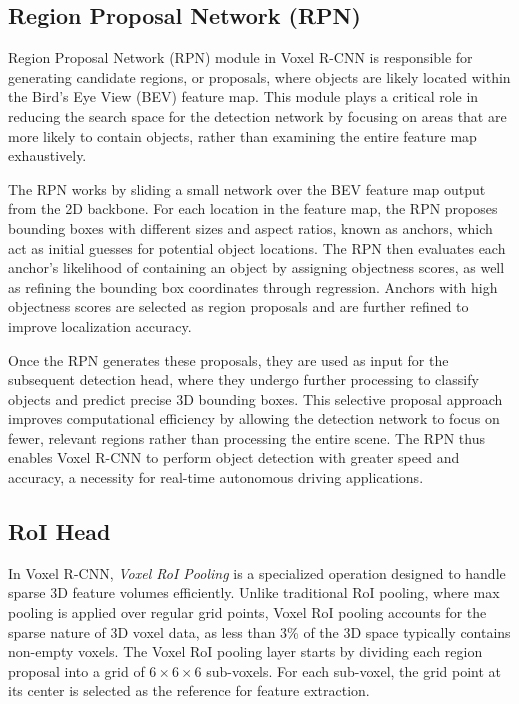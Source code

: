 \subsection{Region Proposal Network (RPN)}
Region Proposal Network (RPN) module in Voxel R-CNN is responsible for generating candidate regions, or proposals, where objects are likely located within the Bird’s Eye View (BEV) feature map. This module plays a critical role in reducing the search space for the detection network by focusing on areas that are more likely to contain objects, rather than examining the entire feature map exhaustively.

The RPN works by sliding a small network over the BEV feature map output from the 2D backbone. For each location in the feature map, the RPN proposes bounding boxes with different sizes and aspect ratios, known as anchors, which act as initial guesses for potential object locations. The RPN then evaluates each anchor’s likelihood of containing an object by assigning objectness scores, as well as refining the bounding box coordinates through regression. Anchors with high objectness scores are selected as region proposals and are further refined to improve localization accuracy.

Once the RPN generates these proposals, they are used as input for the subsequent detection head, where they undergo further processing to classify objects and predict precise 3D bounding boxes. This selective proposal approach improves computational efficiency by allowing the detection network to focus on fewer, relevant regions rather than processing the entire scene. The RPN thus enables Voxel R-CNN to perform object detection with greater speed and accuracy, a necessity for real-time autonomous driving applications.

\subsection{RoI Head}
In Voxel R-CNN, \emph{Voxel RoI Pooling} is a specialized operation designed to handle sparse 3D feature volumes efficiently. Unlike traditional RoI pooling, where max pooling is applied over regular grid points, Voxel RoI pooling accounts for the sparse nature of 3D voxel data, as less than 3\% of the 3D space typically contains non-empty voxels. The Voxel RoI pooling layer starts by dividing each region proposal into a grid of \(6 \times 6 \times 6\) sub-voxels. For each sub-voxel, the grid point at its center is selected as the reference for feature extraction.

